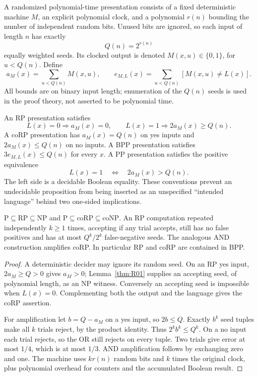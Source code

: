 A randomized polynomial-time presentation consists of a fixed deterministic
machine $M$, an explicit polynomial clock, and a polynomial $r(n)$ bounding
the number of independent random bits. Unused bits are ignored, so each
input of length $n$ has exactly
\[
 Q(n)=2^{r(n)}
\]
equally weighted seeds. Its clocked output is denoted $M(x,u)\in\{0,1\}$,
for $u<Q(n)$. Define
\[
 a_M(x)=\sum_{u<Q(n)}M(x,u),\qquad
 e_{M,L}(x)=\sum_{u<Q(n)}[M(x,u)\ne L(x)].
\]
All bounds are on binary input length; enumeration of the $Q(n)$ seeds is
used in the proof theory, not asserted to be polynomial time.

An RP presentation satisfies
\[
 L(x)=0\Longrightarrow a_M(x)=0,\qquad
 L(x)=1\Longrightarrow 2a_M(x)\geq Q(n).
\]
A coRP presentation has $a_M(x)=Q(n)$ on yes inputs and
$2a_M(x)\leq Q(n)$ on no inputs. A BPP presentation satisfies
$3e_{M,L}(x)\leq Q(n)$ for every $x$. A PP presentation satisfies the
positive equivalence
\[
 L(x)=1\quad\Longleftrightarrow\quad 2a_M(x)>Q(n).
\]
The left side is a decidable Boolean equality. These conventions prevent
an undecidable proposition from being inserted as an unspecified
``intended language'' behind two one-sided implications.

\begin{theorem}\label{thm:R02}
$\mathrm{P}\subseteq\mathrm{RP}\subseteq\mathrm{NP}$ and
$\mathrm{P}\subseteq\mathrm{coRP}\subseteq\mathrm{coNP}$.
An RP computation repeated independently $k\geq1$ times, accepting if any
trial accepts, still has no false positives and has at most $Q^k/2^k$
false-negative seeds. The analogous AND construction amplifies coRP.
In particular RP and coRP are contained in BPP.
\end{theorem}
\begin{proof}
A deterministic decider may ignore its random seed. On an RP yes input,
$2a_M\geq Q>0$ gives $a_M>0$; Lemma~\ref{thm:R01} supplies an accepting
seed, of polynomial length, as an NP witness. Conversely an accepting
seed is impossible when $L(x)=0$. Complementing both the output and the
language gives the coRP assertion.

For amplification let $b=Q-a_M$ on a yes input, so $2b\leq Q$. Exactly
$b^k$ seed tuples make all $k$ trials reject, by the product identity.
Thus $2^k b^k\leq Q^k$. On a no input each trial rejects, so the OR still
rejects on every tuple. Two trials give error at most $1/4$, which is at
most $1/3$. AND amplification follows by exchanging zero and one.
The machine uses $kr(n)$ random bits and $k$ times the original clock,
plus polynomial overhead for counters and the accumulated Boolean result.
\end{proof}

